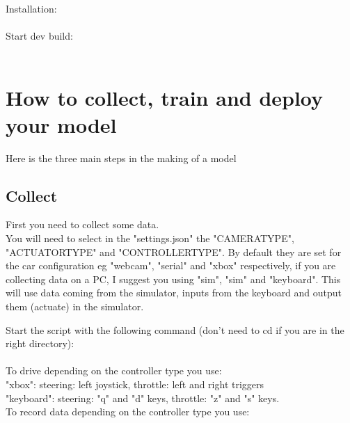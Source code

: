 \documentclass[12pt]{article}
\begin{document}
Installation:\\

\noindent{}\\

Start dev build:\\

\noindent{}\\

\section{How to collect, train and deploy your model}
Here is the three main steps in the making of a model\\

\subsection{Collect}
First you need to collect some data.\\

You will need to select in the "settings.json" the "CAMERA\textunderscore TYPE", "ACTUATOR\textunderscore TYPE" and "CONTROLLER\textunderscore TYPE". By default they are set for the car configuration eg "webcam", "serial" and "xbox" respectively, if you are collecting data on a PC, I suggest you using "sim", "sim" and "keyboard". This will use data coming from the simulator, inputs from the keyboard and output them (actuate) in the simulator.


Start the script with the following command (don't need to cd if you are in the right directory):\\

\noindent{}\\

To drive depending on the controller type you use:\\

"xbox": steering: left joystick, throttle: left and right triggers\\
"keyboard": steering: "q" and "d" keys, throttle: "z" and "s" keys.\\


To record data depending on the controller type you use:\\
\end{document}
